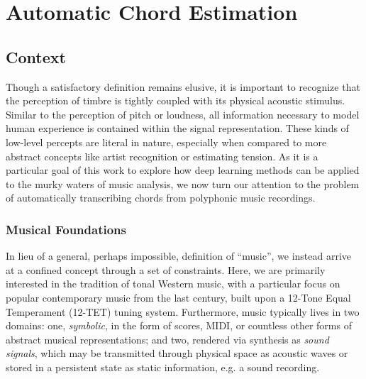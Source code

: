 

\graphicspath{{5/figures/}}

\chapter{Automatic Chord Estimation}
\label{chp:chord_estimation}

\section{Context}
\label{sec:context}

Though a satisfactory definition remains elusive, it is important to recognize that the perception of timbre is tightly coupled with its physical acoustic stimulus.
Similar to the perception of pitch or loudness, all information necessary to model human experience is contained within the signal representation.
These kinds of low-level percepts are literal in nature, especially when compared to more abstract concepts like artist recognition or estimating tension.
As it is a particular goal of this work to explore how deep learning methods can be applied to the murky waters of music analysis, we now turn our attention to the problem of automatically transcribing chords from polyphonic music recordings.

\subsection{Musical Foundations}
\label{subsec:musical_foundations}

In lieu of a general, perhaps impossible, definition of ``music'', we instead arrive at a confined concept through a set of constraints.
Here, we are primarily interested in the tradition of tonal Western music, with a particular focus on popular contemporary music from the last century, built upon a 12-Tone Equal Temperament (12-TET) tuning system.
Furthermore, music typically lives in two domains: one, \emph{symbolic}, in the form of scores, MIDI, or countless other forms of abstract musical representations; and two, rendered via synthesis as \emph{sound signals}, which may be transmitted through physical space as acoustic waves or stored in a persistent state as static information, e.g. a sound recording.

